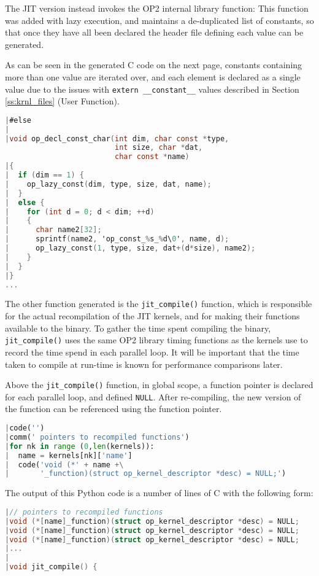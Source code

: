 The JIT version instead invokes the OP2 internal library function:
\noindent This function was added with lazy execution, and maintains a de-duplicated list of constants, so that once they have all been declared the header file defining each value can be generated.
\par
As can be seen in the generated C code on the next page, constants containing more than one value are iterated over, and each element is declared as a single value due to the issues with \verb|extern __constant__| values described in Section \ref{ss:krnl_files} (User Function).
\clearpage
\begin{lstlisting}[backgroundcolor=\color{red!20}, language=C]
|#else
|
|void op_decl_const_char(int dim, char const *type,
                         int size, char *dat,
                         char const *name)
|{
|  if (dim == 1) {
|    op_lazy_const(dim, type, size, dat, name);
|  }
|  else {
|    for (int d = 0; d < dim; ++d)
|    {
|      char name2[32];
|      sprintf(name2, 'op_const_%s_%d\0', name, d);
|      op_lazy_const(1, type, size, dat+(d*size), name2);
|    }
|  }
|}
...
\end{lstlisting}

The other function generated is the \verb|jit_compile()| function, which is responsible for the actual recompilation of the JIT kernels, and for making their functions available to the binary. To gather the time spent compiling the binary, \verb|jit_compile()| uses the same OP2 library timing functions as the kernels use to record the time spend in each parallel loop. It will be important that the time taken to compile at run-time is known for performance comparisons later.
\par
Above the \verb|jit_compile()| function, in global scope, a function pointer is declared for each parallel loop, and defined \verb|NULL|. After re-compiling, the new version of the function can be referenced using the function pointer.

\begin{lstlisting}[backgroundcolor=\color{lightgray!20}, language=Python]
|code('')
|comm(' pointers to recompiled functions')
|for nk in range (0,len(kernels)):
|  name = kernels[nk]['name']
|  code('void (*' + name +\
|       '_function)(struct op_kernel_descriptor *desc) = NULL;')
\end{lstlisting}
\noindent The output of this Python code is a number of lines of C with the following form:
\begin{lstlisting}[backgroundcolor=\color{red!20}, language=C]
|// pointers to recompiled functions
|void (*[name]_function)(struct op_kernel_descriptor *desc) = NULL;
|void (*[name]_function)(struct op_kernel_descriptor *desc) = NULL;
|void (*[name]_function)(struct op_kernel_descriptor *desc) = NULL;
|...
|
|void jit_compile() {
\end{lstlisting}

